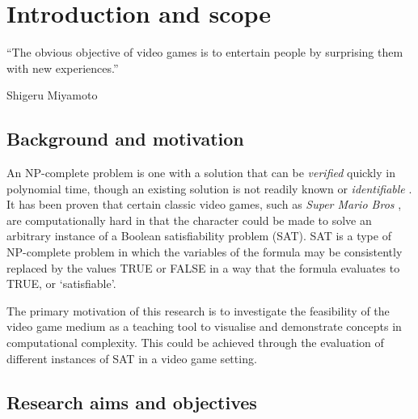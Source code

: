 \documentclass[11pt, a4paper, oneside]{report} %
\begin{document}
\chapter{Introduction and scope}


\epigraph{``The obvious objective of video games is to entertain people by surprising them with new
experiences.''}{Shigeru Miyamoto}


\section{Background and motivation}

An NP-complete problem is one with a solution that can be \textit{verified} quickly in polynomial
time, though an existing solution is not readily known or \textit{identifiable} \cite{cook1984can}.
It has been proven that certain classic video games, such as \textit{Super Mario Bros}
\cite{Aloupis2012}, are computationally hard in that the character could be made
to solve an arbitrary instance of a Boolean satisfiability problem (SAT). SAT is a type of NP-complete problem in which the variables of the formula may be consistently replaced by the values
TRUE or FALSE in a way that the formula evaluates to TRUE, or `satisfiable'.

The primary motivation of this research is to investigate the feasibility of the video game medium
as a teaching tool to visualise and demonstrate concepts in computational complexity. This could be
achieved through the evaluation of different instances of SAT in a video game setting.\@ 



\section{Research aims and objectives}

\end{document}
